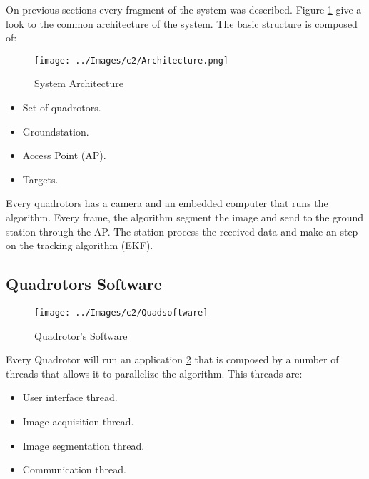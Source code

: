 On previous sections every fragment of the system was described. Figure \ref{fig:System_Architecture} give a look to the common architecture of the system. The basic structure is composed of:
\begin{figure}[hp]
	\centering
	\texttt{[image: ../Images/c2/Architecture.png]}
	\caption{System Architecture}
	\label{fig:System_Architecture}
\end{figure}


\begin{itemize}
  \item Set of quadrotors.
  \item Groundstation.
  \item Access Point (AP).
  \item Targets.
\end{itemize}

Every quadrotors has a camera and an embedded computer that runs the algorithm. Every frame, the algorithm segment the image and send to the ground station through the AP. The station process the received data and make an step on the tracking algorithm (EKF).

\newpage
\subsection{Quadrotors Software}

	\begin{figure}[hp]
		\begin{center}
			\texttt{[image: ../Images/c2/Quadsoftware]}
		\end{center}
		\caption{Quadrotor's Software}
		\label{fig:Quadsoftware}
	\end{figure}

	Every Quadrotor will run an application \ref{fig:Quadsoftware} that is composed by a number of threads that allows it to parallelize the algorithm. This threads are:
	
	
	\begin{itemize}
		\label{itemize:quadappthreads}
		\item User interface thread.
		\item Image acquisition thread.
		\item Image segmentation thread.
		\item Communication thread.
	\end{itemize}
	
	
	
